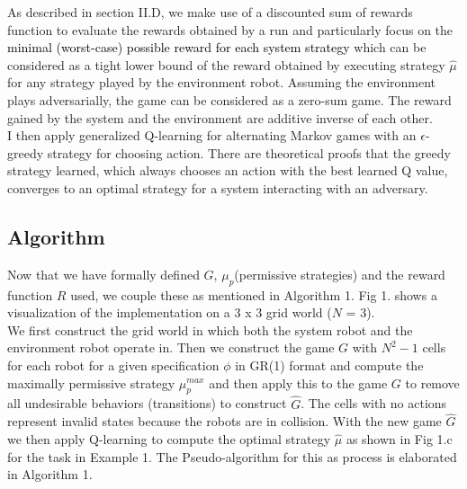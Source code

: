 \documentclass[letterpaper, 10 pt, conference]{ieeeconf}  %
\begin{document}
As described in  section II.D, we make use of a discounted sum of rewards function to evaluate the rewards obtained by a run and particularly focus on the \textcolor{black}{ minimal (worst-case) possible reward for each system strategy} which can be considered as a tight lower bound of the reward obtained by executing strategy $\hat{\mu}$ for any strategy played by the environment robot. Assuming the environment plays adversarially, the game can be considered as a zero-sum game.  The reward gained by the system and the environment are additive inverse of each other.\\ 

I then apply generalized Q-learning for alternating Markov games\cite{c16} with an $\epsilon$-greedy strategy for choosing action. There are theoretical proofs that the greedy strategy learned, which always chooses an action with the best learned Q value, converges to an optimal strategy for a system interacting with an adversary.

\subsection{Algorithm}

Now that we have formally defined $G$, $\mu_p$(permissive strategies) and the reward function $R$ used, we couple these as mentioned in Algorithm 1. Fig 1. shows a visualization of the implementation on a 3 x 3 grid world ($N$ = 3). \\ 

We first construct the grid world in which both the system robot and the environment robot operate in. Then we construct the game $G$ with $N^2 - 1$ cells for each robot for a given specification $\phi$ in GR(1) format and compute the maximally permissive strategy $\mu_p^{max}$ and then apply this to the game $G$ to remove all undesirable behaviors (transitions) to construct $\hat{G}$. The cells with no actions represent invalid states because the robots are in collision. With the new game $\hat{G}$ we then apply Q-learning to compute the optimal strategy $\hat{\mu}$ as shown in Fig 1.c for the task in Example 1. The Pseudo-algorithm for this as process is elaborated in Algorithm 1.\\
\end{document}
